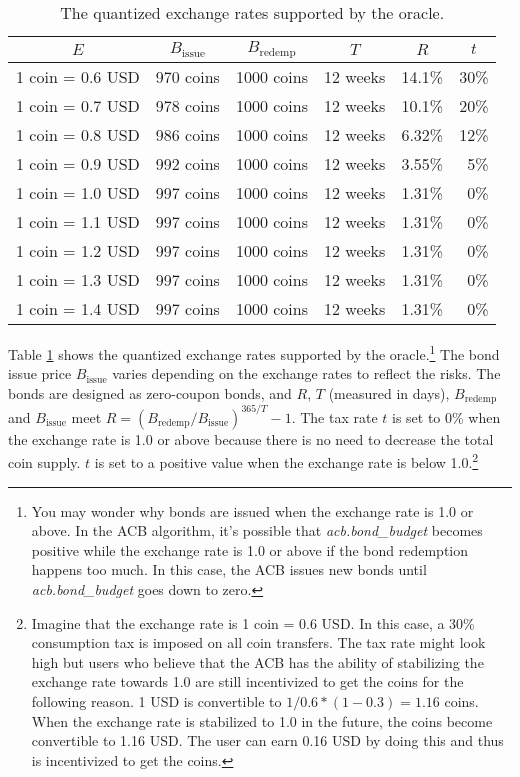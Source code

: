 \documentclass[dvipdfmx,a4paper]{article}
\begin{document}
\begin{table}[htb]
\begin{center}
\caption{The quantized exchange rates supported by the oracle.}\vspace{2ex}
\begin{tabular}{rrrrrr}\hline
\multicolumn{1}{c}{$E$} & \multicolumn{1}{c}{$B_{\mathrm{issue}}$} & \multicolumn{1}{c}{$B_{\mathrm{redemp}}$} & \multicolumn{1}{c}{$T$} & \multicolumn{1}{c}{$R$} & \multicolumn{1}{c}{$t$}\\\hline
1 coin = 0.6 USD & 970 coins & 1000 coins & 12 weeks & 14.1\% & 30\%\\
1 coin = 0.7 USD & 978 coins & 1000 coins & 12 weeks & 10.1\% & 20\%\\
1 coin = 0.8 USD & 986 coins & 1000 coins & 12 weeks & 6.32\% & 12\%\\
1 coin = 0.9 USD & 992 coins & 1000 coins & 12 weeks & 3.55\% & 5\%\\
1 coin = 1.0 USD & 997 coins & 1000 coins & 12 weeks & 1.31\% & 0\%\\
1 coin = 1.1 USD & 997 coins & 1000 coins & 12 weeks & 1.31\% & 0\%\\
1 coin = 1.2 USD & 997 coins & 1000 coins & 12 weeks & 1.31\% & 0\%\\
1 coin = 1.3 USD & 997 coins & 1000 coins & 12 weeks & 1.31\% & 0\%\\
1 coin = 1.4 USD & 997 coins & 1000 coins & 12 weeks & 1.31\% & 0\%\\\hline
\end{tabular}
\label{table1}
\end{center}
\end{table}

Table \ref{table1} shows the quantized exchange rates supported by the oracle.\footnote{You may wonder why bonds are issued when the exchange rate is 1.0 or above. In the ACB algorithm, it's possible that \textit{acb.bond\_budget} becomes positive while the exchange rate is 1.0 or above if the bond redemption happens too much. In this case, the ACB issues new bonds until \textit{acb.bond\_budget} goes down to zero.} The bond issue price $B_{\mathrm{issue}}$ varies depending on the exchange rates to reflect the risks. The bonds are designed as zero-coupon bonds, and $R$, $T$ (measured in days), $B_{\mathrm{redemp}}$ and $B_{\mathrm{issue}}$ meet $R=(B_{\mathrm{redemp}}/B_{\mathrm{issue}})^{365/T}-1$. The tax rate $t$ is set to 0\% when the exchange rate is 1.0 or above because there is no need to decrease the total coin supply. $t$ is set to a positive value when the exchange rate is below 1.0.\footnote{Imagine that the exchange rate is 1 coin = 0.6 USD. In this case, a 30\% consumption tax is imposed on all coin transfers. The tax rate might look high but users who believe that the ACB has the ability of stabilizing the exchange rate towards 1.0 are still incentivized to get the coins for the following reason. 1 USD is convertible to $1 / 0.6 * (1 - 0.3) = 1.16$ coins. When the exchange rate is stabilized to 1.0 in the future, the coins become convertible to 1.16 USD. The user can earn 0.16 USD by doing this and thus is incentivized to get the coins.}
\end{document}
